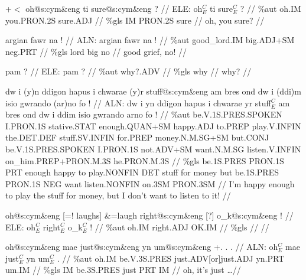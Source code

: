 \documentclass[a4paper,10pt]{article}
\begin{document}
\ex
\begingl[lingstyle=gergl]
\glchat +$<$ oh@s:cym\&eng ti sure@s:cym\&eng ? //
\glsurface ELE:  oh$^{C}_{E}$ ti sure$^{C}_{E}$ ?  //
\glauto \%aut  oh{\scriptsize .IM} you{\scriptsize .PRON.2S} sure{\scriptsize .ADJ}   //
\glmanual \%gls  IM PRON{\scriptsize .2S} sure   //
\gleng oh, you sure? //
\endgl
\xe

\ex
\begingl[lingstyle=gergl]
\glchat argian fawr na ! //
\glsurface ALN:  argian fawr na !  //
\glauto \%aut  good\_lord{\scriptsize .IM} big{\scriptsize .ADJ+SM} neg{\scriptsize .PRT}   //
\glmanual \%gls  lord big no   //
\gleng good grief, no! //
\endgl
\xe

\ex
\begingl[lingstyle=gergl]
\glchat pam ? //
\glsurface ELE:  pam ?  //
\glauto \%aut  why?.ADV   //
\glmanual \%gls  why   //
\gleng why? //
\endgl
\xe

\ex
\begingl[lingstyle=gergl]
\glchat dw i (y)n ddigon hapus i chwarae (y)r stuff@s:cym\&eng am bres ond dw i (ddi)m isio gwrando (ar)no fo ! //
\glsurface ALN:  dw i yn ddigon hapus i chwarae yr stuff$^{C}_{E}$ am bres ond dw i ddim isio gwrando arno fo !  //
\glauto \%aut  be{\scriptsize .V.1S.PRES.SPOKEN} I{\scriptsize .PRON.1S} stative{\scriptsize .STAT} enough{\scriptsize .QUAN+SM} happy{\scriptsize .ADJ} to{\scriptsize .PREP} play{\scriptsize .V.INFIN} the{\scriptsize .DET.DEF} stuff{\scriptsize .SV.INFIN} for{\scriptsize .PREP} money{\scriptsize .N.M.SG+SM} but{\scriptsize .CONJ} be{\scriptsize .V.1S.PRES.SPOKEN} I{\scriptsize .PRON.1S} not{\scriptsize .ADV+SM} want{\scriptsize .N.M.SG} listen{\scriptsize .V.INFIN} on\_him{\scriptsize .PREP+PRON.M.3S} he{\scriptsize .PRON.M.3S}   //
\glmanual \%gls  be{\scriptsize .1S.PRES} PRON{\scriptsize .1S} PRT enough happy to play{\scriptsize .NONFIN} DET stuff for money but be{\scriptsize .1S.PRES} PRON{\scriptsize .1S} NEG want listen{\scriptsize .NONFIN} on{\scriptsize .3SM} PRON{\scriptsize .3SM}   //
\gleng I'm happy enough to play the stuff for money, but I don't want to listen to it! //
\endgl
\xe

\ex
\begingl[lingstyle=gergl]
\glchat oh@s:cym\&eng [=! laughs] \&=laugh right@s:cym\&eng [?] o\_k@s:cym\&eng ! //
\glsurface ELE:  oh$^{C}_{E}$ right$^{C}_{E}$ o\_k$^{C}_{E}$ !  //
\glauto \%aut  oh{\scriptsize .IM} right{\scriptsize .ADJ} OK{\scriptsize .IM}   //
\glmanual \%gls       //
\gleng  //
\endgl
\xe

\ex
\begingl[lingstyle=gergl]
\glchat oh@s:cym\&eng mae just@s:cym\&eng yn um@s:cym\&eng +. . . //
\glsurface ALN:  oh$^{C}_{E}$ mae just$^{C}_{E}$ yn um$^{C}_{E}$ .  //
\glauto \%aut  oh{\scriptsize .IM} be{\scriptsize .V.3S.PRES} just{\scriptsize .ADV[or]just.ADJ} yn{\scriptsize .PRT} um{\scriptsize .IM}   //
\glmanual \%gls  IM be{\scriptsize .3S.PRES} just PRT IM   //
\gleng oh, it's just \dots  //
\endgl
\xe
\end{document}
